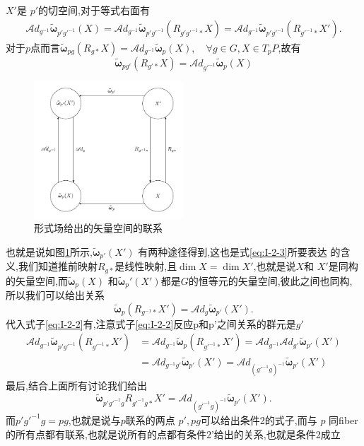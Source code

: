 \documentclass[../main.tex]{subfiles}
\begin{document}
    $X'$是 $p'$的切空间,对于等式右面有
    \begin{align}
      \mathscr{A}\!d_{g^{-1}}\bm{\tilde{\omega}}_{p'g'^{-1}}(X) =  \mathscr{A}\!d_{g^{-1}}\bm{\tilde{\omega}}_{p'g'^{-1}}(R_{g'g'^{-1}*} X) = \mathscr{A}\!d_{g^{-1}}\bm{\tilde{\omega}}_{p'g'^{-1}}(R_{g'^{-1}*}X')
      \label{eq:I-2-2}
    .\end{align}
    对于$p$点而言$\bm{\tilde{\omega}}_{pg}(R_{g*}X) = \mathscr{A}\!d_{g^{-1}}\bm{\tilde{\omega}}_p(X), \quad \forall g \in G, X \in T_pP $,故有
    \begin{equation}
      \label{eq:I-2-3}
    \bm{\tilde{\omega}}_{pg'}(R_{g'*}X) = \mathscr{A}\!d_{g'^{-1}}\bm{\tilde{\omega}}_p(X)
  \end{equation}
    \begin{figure}[htpb]
      \centering
      \includegraphics[width=0.5\textwidth]{../tikzpicture/I21}
      \caption{形式场给出的矢量空间的联系}
      \label{fig:I-2-1}
    \end{figure}

    也就是说如图\ref{fig:I-2-1}所示,$\bm{\tilde{\omega}}_{p'}(X')$ 有两种途径得到,这也是式\ref{eq:I-2-3}所要表达
    的含义,我们知道推前映射$R_{g*}$是线性映射,且$\dim{X} = \dim{X'}$,也就是说$X$和 $X'$是同构的矢量空间,而$\bm{\tilde{\omega}}_p(X)$ 和$\bm{\tilde{\omega}}_p'(X')$都是$G$的恒等元的矢量空间,彼此之间也同构,
    所以我们可以给出关系\[
      \bm{\tilde{\omega}}_p(R_{g^{-1}*} X') = \mathscr{A}\!d_{g}\bm{\tilde{\omega}}_{p'}(X')  
    .\] 
    代入式子\ref{eq:I-2-2}有,注意式子\ref{eq:I-2-2}反应p和p'之间关系的群元是$g'$
    \begin{align*}
      \mathscr{A}\!d_{g^{-1}}\bm{\tilde{\omega}}_{p'g'^{-1}}(R_{g'^{-1}*}X')& = \mathscr{A}\!d_{g^{-1}}\bm{\tilde{\omega}}_p(R_{g'^{-1}*}X') = \mathscr{A}\!d_{g^{-1}}\mathscr{A}\!d_{g'}\bm{\tilde{\omega}}_{p'}(X')\\& = \mathscr{A}\!d_{g^{-1}g'} \bm{\tilde{\omega}}_{p'}(X') = \mathscr{A}\!d_{(g'^{-1}g)^{-1}}\bm{\tilde{\omega}}_{p'}(X')
    \end{align*}
    最后,结合上面所有讨论我们给出\[
    \bm{\tilde{\omega}}_{p'g'^{-1}g}R_{g'^{-1}g*}X' = \mathscr{A}\!d_{(g'^{-1}g)^{-1}}\bm{\tilde{\omega}}_{p'}(X')
    .\] 
    而$p'g'^{-1}g = pg$,也就是说与$p$联系的两点 $p',pg$可以给出条件2的式子,而与 $p$ 同fiber的所有点都有联系,也就是说所有的点都有条件2'给出的关系,也就是条件2成立
\end{document}
